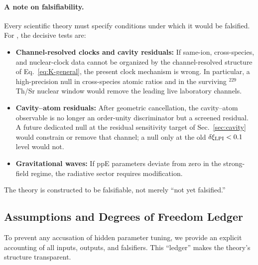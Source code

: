 \paragraph{A note on falsifiability.}
Every scientific theory must specify conditions under which it would be 
falsified. For \DFD, the decisive tests are:
\begin{itemize}
\item \textbf{Channel-resolved clocks and cavity residuals:} If same-ion, cross-species, and nuclear-clock data cannot be organized by the channel-resolved structure of Eq.~\eqref{eq:K-general}, the present clock mechanism is wrong. In particular, a high-precision null in cross-species atomic ratios and in the surviving $^{229}$Th/Sr nuclear window would remove the leading live laboratory channels.
\item \textbf{Cavity--atom residuals:} After geometric cancellation, the cavity--atom observable is no longer an order-unity discriminator but a screened residual. A future dedicated null at the residual sensitivity target of Sec.~\ref{sec:cavity} would constrain or remove that channel; a null only at the old $\delta\xi_{\rm LPI}<0.1$ level would not.
\item \textbf{Gravitational waves:} If ppE parameters deviate from zero 
in the strong-field regime, the radiative sector requires modification.
\end{itemize}
The theory is constructed to be falsifiable, not merely 
``not yet falsified.''

\subsection{Assumptions and Degrees of Freedom Ledger}\label{sec:dof_ledger}

To prevent any accusation of hidden parameter tuning, we provide an explicit accounting of all inputs, outputs, and falsifiers. This ``ledger'' makes the theory's structure transparent.

